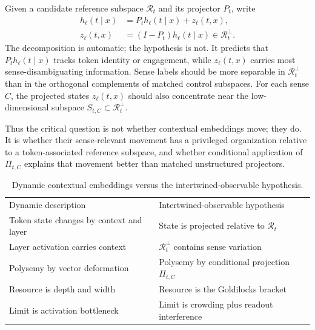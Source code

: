\documentclass[
  aps,
  reprint,
  superscriptaddress,
  floatfix,
  nofootinbib,
  longbibliography
]{revtex4-2}
\begin{document}
Given a candidate reference subspace $\mathcal R_t$ and its projector $P_t$,
write
%
\begin{align}
\label{eq:layer-decomp}
h_\ell(t\mid x)
&=P_t h_\ell(t\mid x)+z_\ell(t,x),\\
z_\ell(t,x)&=(I-P_t)h_\ell(t\mid x)
\in\mathcal R_t^\perp.\nonumber
\end{align}
%
The decomposition is automatic; the hypothesis is not. It predicts that
$P_t h_\ell(t\mid x)$ tracks token identity or engagement, while
$z_\ell(t,x)$ carries most sense-disambiguating information. Sense labels
should be more separable in $\mathcal R_t^\perp$ than in the orthogonal
complements of matched control subspaces. For each sense $C$, the projected
states $z_\ell(t,x)$ should also concentrate near the low-dimensional
subspace $S_{t,C}\subset\mathcal R_t^\perp$.

Thus the critical question is not whether contextual embeddings move; they
do. It is whether their sense-relevant movement has a privileged organization
relative to a token-associated reference subspace, and whether conditional
application of $\Pi_{t,C}$ explains that movement better than matched
unstructured projectors.

\begin{table}[ht]
\caption{Dynamic contextual embeddings versus the intertwined-observable
hypothesis.}
\label{tab:two-views}
\centering
\begin{minipage}{0.72\textwidth}
\begin{ruledtabular}
\begin{tabular}{@{}ll@{}}
Dynamic description & Intertwined-observable hypothesis \\
\colrule
Token state changes by context and layer & State is projected relative to $\mathcal R_t$ \\
Layer activation carries context & $\mathcal R_t^\perp$ contains sense variation \\
Polysemy by vector deformation & Polysemy by conditional projection $\Pi_{t,C}$ \\
Resource is depth and width & Resource is the Goldilocks bracket \\
Limit is activation bottleneck & Limit is crowding plus readout interference \\
\end{tabular}
\end{ruledtabular}
\end{minipage}
\end{table}
\end{document}
